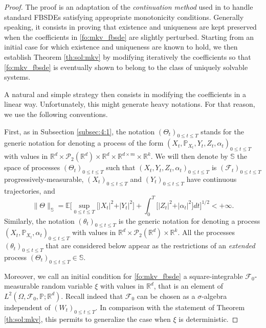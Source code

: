 \documentclass[11pt]{amsart}
\begin{document}
\begin{proof}
The proof is an adaptation of the \emph{continuation method} used in \cite{PengWu} to handle standard FBSDEs satisfying appropriate monotonicity conditions. 
Generally speaking, it consists in proving that existence and uniqueness are kept preserved when the coefficients in \eqref{fo:mkv_fbsde}
are slightly perturbed. Starting from an initial case for which existence and uniqueness are known to hold, we then establish Theorem 
\ref{th:sol:mkv} by modifying iteratively the coefficients so that \eqref{fo:mkv_fbsde} is eventually shown to belong to the class of uniquely solvable systems. 

A natural and simple strategy then consists in modifying the coefficients in a linear way. Unfortunately, this might generate heavy notations.  For that reason, we use the following conventions. 

First, as in Subsection \ref{subsec:4:1}, the notation $(\Theta_{t})_{0 \leq t \leq T}$ stands for the generic notation for
denoting a process of the form $(X_{t},{\mathbb P}_{X_{t}},Y_{t},Z_{t},\alpha_{t})_{0 \leq t \leq T}$ with values in ${\mathbb R}^d \times {\mathcal P}_{2}({\mathbb R}^d)  \times {\mathbb R}^d \times {\mathbb R}^{d\times m} \times {\mathbb R}^k$. 
We will then denote by ${\mathbb S}$ the space of processes 
$(\Theta_{t})_{0 \leq t \leq T}$ such that $(X_{t},Y_{t},Z_{t},\alpha_{t})_{0 \leq t \leq T}$ is $({\mathcal F}_{t})_{0 \leq t \leq T}$ progressively-measurable, $(X_{t})_{0 \leq t \leq T}$ and $(Y_{t})_{0 \leq t \leq T}$ have continuous trajectories, and 
\begin{equation}
\label{eq:norm S}
\| \Theta \|_{\mathbb S} =
{\mathbb E} \biggl[ \sup_{0 \leq t \leq T} \bigl[ 
\vert X_{t} \vert^2 + \vert Y_{t} \vert^2 \bigr] + \int_{0}^T \bigl[ \vert Z_{t} \vert^2 + \vert \alpha_{t}\vert^2 \bigr] dt
\biggr]^{1/2} < +\infty. 
\end{equation}
Similarly, the notation 
$(\theta_{t})_{0 \leq t \leq T}$ is the generic notation for
denoting a process $(X_{t},{\mathbb P}_{X_{t}},\alpha_{t})_{0 \leq t \leq T}$ with values in 
${\mathbb R}^d \times {\mathcal P}_{2}({\mathbb R}^d) \times {\mathbb R}^k$. All the processes $(\theta_{t})_{0 \leq t \leq T}$ that are considered below appear as the restrictions of an \emph{extended} process 
$(\Theta_{t})_{0 \leq t \leq T} \in {\mathbb S}$. 

Moreover, we call an initial condition for \eqref{fo:mkv_fbsde} a square-integrable ${\mathcal F}_{0}$-measurable random variable $\xi$ with values in ${\mathbb R}^d$, that is an element of $L^2(\Omega,{\mathcal F}_{0},{\mathbb P};{\mathbb R}^d)$. Recall indeed that ${\mathcal F}_{0}$ can be chosen as a $\sigma$-algebra independent of $(W_{t})_{0 \leq t \leq T}$. 
In comparison with the statement of Theorem \ref{th:sol:mkv}, this permits to generalize the case when $\xi$ is deterministic.


\end{proof}
\end{document}
